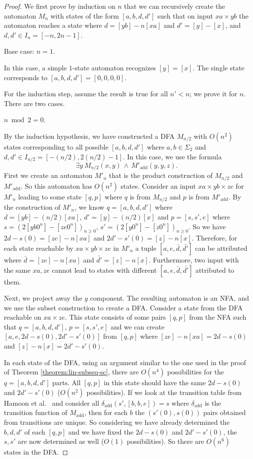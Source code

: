 \documentclass[12pt,reqno]{article}
\def\AND{\, \wedge \, }
\DeclareMathOperator{\add}{add}
\begin{document}
\begin{proof}
    
We first prove by induction on $n$ that we can recursively create the automaton $M_n$ with states of the form $[a, b, d, d']$ such that on input $xa \times yb$ the automaton reaches a state where $d = [yb]-n[xa]$ and $d'=[y]-[x]$, and $d, d' \in I_n = [-n, 2n-1]$.

Base case: $n=1$.

In this case, a simple $1$-state automaton recognizes $[y]=[x]$. The single state corresponds to $[a, b, d, d'] = [0, 0, 0, 0]$.

For the induction step, assume the result is true for all $n'<n$; we prove it for $n$.
There are two cases.

\bigskip{} $n \bmod 2 = 0$.

By the induction hypothesis, we have constructed a DFA $M_{n/2}$ with $O(n^2)$ states corresponding to all possible $[a, b, d, d']$ where $a, b \in \Sigma_2$ and $d, d' \in I_{n/2} = [-(n/2), 2(n/2)-1]$.
In this case, we use the formula
$$ \exists y \ M_{n/2}(x,y) \AND M'_{\add}(y, y, z).$$
First we create an automaton $M'_{n}$ that is the product construction of $M_{n/2}$ and $M'_{\add}$. So this automaton has $O(n^2)$ states. Consider an input $xa \times yb \times ze$ for $M'_{n}$ leading to some state $[q, p]$ where $q$ is from $M_{n/2}$ and $p$ is from $M'_{\add}$. By the construction of $M'_{n}$, we know $q=[a, b, d, d']$ where $d=[yb]-(n/2)[xa]$, $d'=[y]-(n/2)[x]$ and  $p=[s, s', e]$ where $s=(2[yb0^n]-[ze0^n])_{n \geq 0}$, $s'=(2[y0^n]-[z0^n])_{n \geq 0}$.
So we have $2d-s(0) = [ze]-n[xa]$ and $2d'-s'(0) = [z]-n[x]$.
Therefore, for each state reachable by $xa \times yb \times ze$ in $M'_n$ a tuple $[a, e, \bar{d}, \bar{d'}]$ can be attributed where $\bar{d}=[ze]-n[xa]$ and $\bar{d'}=[z]-n[x]$. Furthermore, two input with the same $xa, ze$ cannot lead to states with different $[a, e, \bar{d}, \bar{d'}]$ attributed to them. 

Next, we project away the $y$ component.  The resulting automaton is an NFA, and we use the subset construction to create a DFA.  Consider a state from the DFA reachable on $xa \times ze$. This state consists of some pairs $[q, p]$ from the NFA such that $q=[a, b, d, d']$, $p=[s, s', e]$ and
we can create $[a, e, 2d-s(0), 2d'-s'(0)]$ from $[q, p]$ where $[ze]-n[xa]=2d-s(0)$ and $[z]-n[x]=2d'-s'(0)$.

In each state of the DFA, using an argument similar to the one used in the proof of Theorem \ref{theorem:lin-subseq-sc}, there are $O(n^4)$ possibilities for the $q=[a, b, d, d']$ parts. 
All $[q, p]$ in this state should have the same $2d-s(0)$ and $2d'-s'(0)$ ($O(n^2)$ possibilities).
If we look at the transition table from Hamoon et al.~\cite{mousavi_decision_2016} and consider all $\delta_{\add}(s', [b, b, e])=s$ where $\delta_{\add}$ is the transition function of $M_{\add}$, then for each $b$ the $(s'(0), s(0))$ pairs obtained from transitions are unique. So considering we have already determined the $b, d, d'$ of each $[q, p]$ and we have fixed the $2d-s(0)$ and $2d'-s'(0)$, the $s, s'$ are now determined as well ($O(1)$ possibilities). So there are $O(n^6)$ states in the DFA.


\end{proof}
\end{document}
